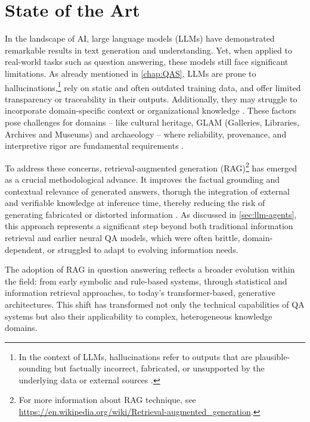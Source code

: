 \chapter{State of the Art}
\label{chap:sota}
\begin{spacing}{1.5}
\sloppy
In the landscape of AI, large language models (LLMs) have demonstrated remarkable results in text generation and understanding. Yet, when applied to real-world tasks such as question answering, these models still face significant limitations. As already mentioned in \autoref{chap:QAS}, LLMs are prone to hallucinations,\footnote{In the context of LLMs, hallucinations refer to outputs that are plausible-sounding but factually incorrect, fabricated, or unsupported by the underlying data or external sources \citep{harsh_comprehending_2024}.} rely on static and often outdated training data, and offer limited transparency or traceability in their outputs. Additionally, they may struggle to incorporate domain-specific context or organizational knowledge \citep{vaibhav_retrieval-augmented_2025}. These factors pose challenges for domains -- like cultural heritage, GLAM (Galleries, Libraries, Archives and Museums) and archaeology -- where reliability, provenance, and interpretive rigor are fundamental requirements \citep{di_marcantonio_intelligenza_2024}.

To address these concerns, retrieval-augmented generation (RAG)\footnote{For more information about RAG technique, see \url{https://en.wikipedia.org/wiki/Retrieval-augmented_generation}.} has emerged as a crucial methodological advance. It improves the factual grounding and contextual relevance of generated answers, thorugh the integration of external and verifiable knowledge at inference time, thereby reducing the risk of generating fabricated or distorted information \citep{martineau_what_2023}. As discussed in \autoref{sec:llm-agents}, this approach represents a significant step beyond both traditional information retrieval and earlier neural QA models, which were often brittle, domain-dependent, or struggled to adapt to evolving information needs.

The adoption of RAG in question answering reflects a broader evolution within the field: from early symbolic and rule-based systems, through statistical and information retrieval approaches, to today’s transformer-based, generative architectures. This shift has transformed not only the technical capabilities of QA systems but also their applicability to complex, heterogeneous knowledge domains.


\end{spacing}
